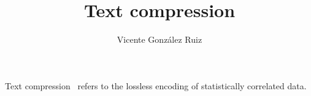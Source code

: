 \title{Text compression}
\author{Vicente González Ruiz}
\maketitle

Text compression~\cite{mahoney2012data, wikibooks2018data,
  moffat2002compression, wiegand2011source, blelloch2001introduction,
  salomon2004data} refers to the lossless encoding of statistically
correlated data.

\section{}
\section{}
\section{}



